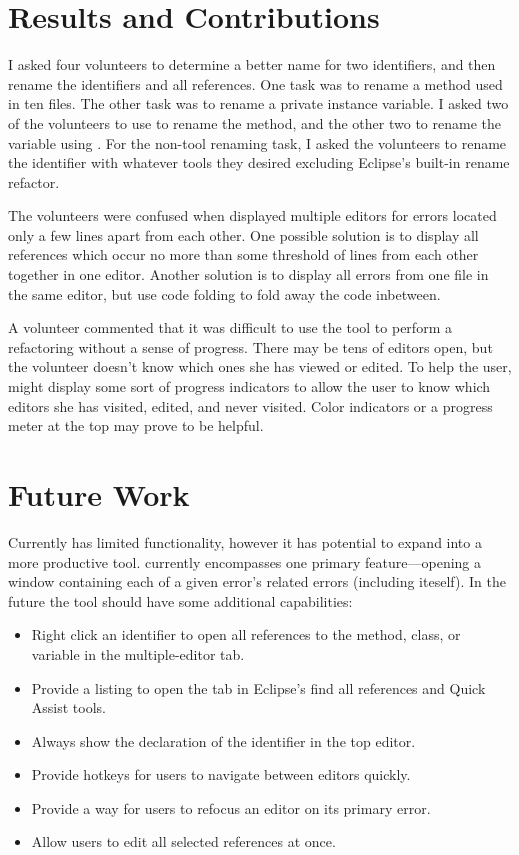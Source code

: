 \documentclass{sigplanconf}
\begin{document}
\section{Results and Contributions}
I asked four volunteers to
determine a better
name for two identifiers, and then rename the identifiers and all references.
One task was to rename a method used in ten files.
The other task was to rename a private instance variable. I asked two of the
volunteers to use \pname{} to rename the method, and the other two
to rename the variable using \pname{}.
For the non-tool renaming task, I asked the volunteers to rename the identifier
with whatever tools they desired excluding Eclipse's built-in rename refactor.

The volunteers were confused when \pname{} displayed multiple editors for errors
located only a few lines apart from each other. One possible solution is to
display all references which occur no more than some threshold of lines from
each other together in one editor. Another
solution is to display all errors from one
file in the same editor, but use code folding to fold away the code inbetween.

A volunteer commented that it was difficult to use the tool to perform
a refactoring without a sense of progress. There may be tens of editors
open, but the volunteer doesn't know which ones she has viewed or edited.
To help the user, \pname{} might display
some sort of progress indicators to allow the user to know which editors
she has visited, edited, and never visited. Color indicators or a progress
meter at the top may prove to be helpful.

\section{Future Work}
Currently \pname{} has limited functionality, however it has potential to expand
into a more productive tool. \pname{} currently encompasses one primary
feature---opening a window containing each of a given error's related errors
(including iteself). In the future the tool should have some additional
capabilities:

\begin{itemize}
  \item Right click an identifier to open all references to the method, class,
      or variable in the multiple-editor tab.
  \item Provide a listing to open the tab in Eclipse's find all references and
      Quick Assist tools.
  \item Always show the declaration of the identifier in the top editor.
  \item Provide hotkeys for users to navigate between editors quickly.
  \item Provide a way for users to refocus an editor on its primary error.
  \item Allow users to edit all selected references at once.
\end{itemize}
\end{document}
